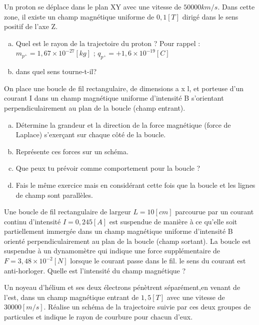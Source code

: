\begin{exercise}
    Un proton se déplace dans le plan XY avec une vitesse de \(50 000km/s\). Dans cette zone, il existe un champ magnétique uniforme de \(0,1 [T]\) dirigé dans le sens positif de l'axe Z.
    \begin{enumerate}[a)]
        \item Quel est le rayon de la trajectoire du proton ? Pour rappel : \(m_{p^+}=1,67 \times 10^{-27} [kg]\) ; \(q_{p^+}=+1,6 \times 10^{-19} [C]\)
        \item dans quel sens tourne-t-il?
    \end{enumerate}
\end{exercise}

\begin{exercise}
    On place une boucle de fil rectangulaire, de dimensions a x l, et porteuse d'un courant I dans un champ magnétique uniforme d'intensité B s'orientant perpendiculairement au plan de la boucle (champ entrant).
    \begin{enumerate}[a)]
        \item Détermine la grandeur et la direction de la force magnétique (force de Laplace) s'exerçant sur chaque côté de la boucle.
        \item Représente ces forces sur un schéma.
        \item Que peux tu prévoir comme comportement pour la boucle ?
        \item Fais le même exercice mais en considérant cette fois que la boucle et les lignes de champ sont parallèles.
    \end{enumerate}
\end{exercise}

\begin{exercise}
    Une boucle de fil rectangulaire de largeur \(L=10[cm]\) parcourue par un courant continu d'intensité \(I=0,245[A]\) est suspendue de manière à ce qu'elle soit partiellement immergée dans un champ magnétique uniforme d'intensité B orienté perpendiculairement au plan de la boucle (champ sortant). La boucle est suspendue à un dynamomètre qui indique une force supplémentaire de \(F=3,48 \times 10^{-2} [N]\) lorsque le courant passe dans le fil. le sens du courant est anti-horloger. Quelle est l'intensité du champ magnétique ?
\end{exercise}


\begin{exercise}
    Un noyeau d'hélium et ses deux électrons pénètrent séparément,en venant de l'est, dans un champ magnétique entrant de \(1,5[T]\) avec une vitesse de \(30000[m/s]\). Réalise un schéma de la trajectoire suivie par ces deux groupes de particules et indique le rayon de courbure pour chacun d'eux.
\end{exercise}

